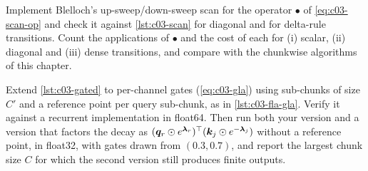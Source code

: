 \begin{exercise}\label{exe:c03-blelloch}
Implement Blelloch's up-sweep/down-sweep scan for the operator $\bullet$ of
\cref{eq:c03-scan-op} and check it against \cref{lst:c03-scan} for diagonal and for delta-rule
transitions. Count the applications of $\bullet$ and the cost of each for (i) scalar, (ii)
diagonal and (iii) dense transitions, and compare with the chunkwise algorithms of this chapter.
\end{exercise}

\begin{exercise}\label{exe:c03-gla-code}
Extend \cref{lst:c03-gated} to per-channel gates (\cref{eq:c03-gla}) using sub-chunks of size
$C'$ and a reference point per query sub-chunk, as in \cref{lst:c03-fla-gla}. Verify it against
a recurrent implementation in float64. Then run both your version and a version that factors the
decay as $(\bm{q}_r\odot e^{\bm\lambda_r})^{\top}(\bm{k}_j\odot e^{-\bm\lambda_j})$ without a reference point,
in float32, with gates drawn from $(0.3,0.7)$, and report the largest chunk size $C$ for which the
second version still produces finite outputs.
\end{exercise}

\flushbottom
